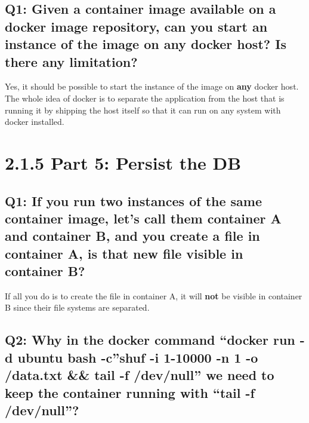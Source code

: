 \documentclass[
]{article}
\begin{document}
\hypertarget{q1-given-a-container-image-available-on-a-docker-image-repository-can-you-start-an-instance-of-the-image-on-any-docker-host-is-there-any-limitation}{%
\subsection{Q1: Given a container image available on a docker image
repository, can you start an instance of the image on any docker host?
Is there any
limitation?}\label{q1-given-a-container-image-available-on-a-docker-image-repository-can-you-start-an-instance-of-the-image-on-any-docker-host-is-there-any-limitation}}

Yes, it should be possible to start the instance of the image on
\textbf{any} docker host. The whole idea of docker is to separate the
application from the host that is running it by shipping the host itself
so that it can run on any system with docker installed.

\hypertarget{part-5-persist-the-db}{%
\section{2.1.5 Part 5: Persist the DB}\label{part-5-persist-the-db}}

\hypertarget{q1-if-you-run-two-instances-of-the-same-container-image-lets-call-them-container-a-and-container-b-and-you-create-a-file-in-container-a-is-that-new-file-visible-in-container-b}{%
\subsection{Q1: If you run two instances of the same container image,
let’s call them container A and container B, and you create a file in
container A, is that new file visible in container
B?}\label{q1-if-you-run-two-instances-of-the-same-container-image-lets-call-them-container-a-and-container-b-and-you-create-a-file-in-container-a-is-that-new-file-visible-in-container-b}}

If all you do is to create the file in container A, it will \textbf{not}
be visible in container B since their file systems are separated.

\hypertarget{q2-why-in-the-docker-command-docker-run--d-ubuntu-bash--cshuf--i-1-10000--n-1--o-data.txt-tail--f-devnull-we-need-to-keep-the-container-running-with-tail--f-devnull}{%
\subsection{Q2: Why in the docker command “docker run -d ubuntu bash
-c”shuf -i 1-10000 -n 1 -o /data.txt \&\& tail -f /dev/null” we need to
keep the container running with “tail -f
/dev/null”?}\label{q2-why-in-the-docker-command-docker-run--d-ubuntu-bash--cshuf--i-1-10000--n-1--o-data.txt-tail--f-devnull-we-need-to-keep-the-container-running-with-tail--f-devnull}}
\end{document}
